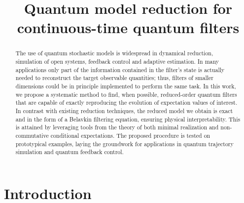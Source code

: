 \documentclass[aihp,12pt]{imsart}
\begin{document}
\begin{frontmatter}
\title{Quantum model reduction for continuous-time quantum filters}


\begin{abstract}
The use of quantum stochastic models is widespread in dynamical reduction, simulation of open systems, feedback control and adaptive estimation. In many applications only part of the information contained in the filter's state is actually needed to reconstruct the target observable quantities; thus, filters of smaller dimensions could be in principle implemented to perform the same task. In this work, we propose a systematic method to find, when possible, reduced-order quantum filters that are capable of exactly reproducing the evolution of expectation values of interest. In contrast with existing reduction techniques, the reduced model we obtain is exact and in the form of a Belavkin filtering equation, ensuring physical interpretability. This is attained by leveraging tools from the theory of both minimal realization and non-commutative conditional expectations. The proposed procedure is tested on prototypical examples, laying the groundwork for applications in quantum trajectory simulation and quantum feedback control.
\end{abstract}
\end{frontmatter}

\section{Introduction}
\end{document}
